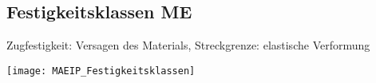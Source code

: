 \subsection{Festigkeitsklassen \hfill ME}
\begin{footnotesize}
    Zugfestigkeit: Versagen des Materials, Streckgrenze: elastische Verformung
    \begin{center}
        \texttt{[image: MAEIP\_Festigkeitsklassen]}
    \end{center}
\end{footnotesize}
